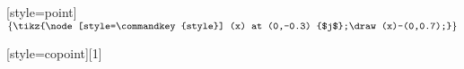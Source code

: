 \newkeycommand{\onb}[style=point]{\ensuremath{\left\{\tikz{\node[style=\commandkey{style}] (x) at (0,-0.3) {$j$};\draw (x)--(0,0.7);}\right\}}\xspace}

\newcommand{\whiteonb}{\onb[style=point]}

\newcommand{\grayonb}{\onb[style=gray point]}

\newcommand{\redonb}{\onb[style=red point]}

\newcommand{\greenonb}{\onb[style=green point]}


\newkeycommand{\copointmap}[style=copoint][1]{\,\,}

\newcommand{\redpointmap}[1]{\,\tikz{\node[style=red point] (x) at (0,-0.3) {$#1$};\draw (x)--(0,0.7);}\,}

\newcommand{\redcopointmap}[1]{\,\tikz{\node[style=red copoint] (x) at (0,0.3) {$#1$};\draw (x)--(0,-0.7);}\,}

\newcommand{\greenpointmap}[1]{\,\tikz{\node[style=green point] (x) at (0,-0.3) {$#1$};\draw (x)--(0,0.7);}\,}

\newcommand{\greencopointmap}[1]{\,\tikz{\node[style=green copoint] (x) at (0,0.3) {$#1$};\draw (x)--(0,-0.7);}\,}




